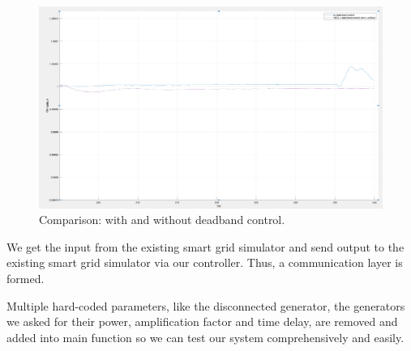 \begin{figure}[!htbp]
\center
\includegraphics[scale=0.2]{figure/3_3_deadband_result.png}
\caption{Comparison: with and without deadband control.}
\label{3_3_deadband_result}
\end{figure}



We get the input from the existing smart grid simulator and send output to the existing smart grid simulator via our controller. Thus, a communication layer is formed.

Multiple hard-coded parameters, like the disconnected generator, the generators we asked for their power, amplification factor and time delay, are removed and added into main function so we can test our system comprehensively and easily. 